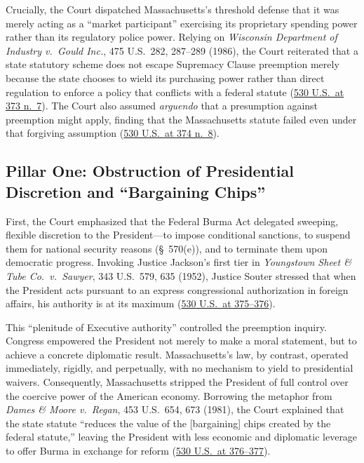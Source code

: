 \documentclass[12pt]{article}
\begin{document}
Crucially, the Court dispatched Massachusetts's threshold defense that it was merely acting as a ``market participant'' exercising its proprietary spending power rather than its regulatory police power. Relying on \textit{Wisconsin Department of Industry v.\ Gould Inc.}, 475 U.S.\ 282, 287--289 (1986), the Court reiterated that a state statutory scheme does not escape Supremacy Clause preemption merely because the state chooses to wield its purchasing power rather than direct regulation to enforce a policy that conflicts with a federal statute (\href{https://tile.loc.gov/storage-services/service/ll/usrep/usrep530/usrep530363/usrep530363.pdf}{530 U.S.\ at 373 n.\ 7}). The Court also assumed \textit{arguendo} that a presumption against preemption might apply, finding that the Massachusetts statute failed even under that forgiving assumption (\href{https://www.law.cornell.edu/supct/html/99-474.ZO.html}{530 U.S.\ at 374 n.\ 8}).

\subsection{Pillar One: Obstruction of Presidential Discretion and ``Bargaining Chips''}
First, the Court emphasized that the Federal Burma Act delegated sweeping, flexible discretion to the President---to impose conditional sanctions, to suspend them for national security reasons (\S~570(e)), and to terminate them upon democratic progress. Invoking Justice Jackson's first tier in \textit{Youngstown Sheet \& Tube Co.\ v.\ Sawyer}, 343 U.S.\ 579, 635 (1952), Justice Souter stressed that when the President acts pursuant to an express congressional authorization in foreign affairs, his authority is at its maximum (\href{https://www.law.cornell.edu/supct/html/99-474.ZS.html}{530 U.S.\ at 375--376}).

This ``plenitude of Executive authority'' controlled the preemption inquiry. Congress empowered the President not merely to make a moral statement, but to achieve a concrete diplomatic result. Massachusetts's law, by contrast, operated immediately, rigidly, and perpetually, with no mechanism to yield to presidential waivers. Consequently, Massachusetts stripped the President of full control over the coercive power of the American economy. Borrowing the metaphor from \textit{Dames \& Moore v.\ Regan}, 453 U.S.\ 654, 673 (1981), the Court explained that the state statute ``reduces the value of the [bargaining] chips created by the federal statute,'' leaving the President with less economic and diplomatic leverage to offer Burma in exchange for reform (\href{https://caselaw.findlaw.com/court/us-supreme-court/530/363.html}{530 U.S.\ at 376--377}).
\end{document}
